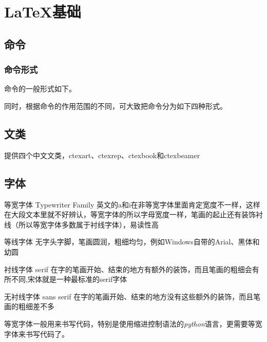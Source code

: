 {\let\clearpage\relax \chapter{\LaTeX 基础}}

\section{命令}

\subsection{命令形式}

命令的一般形式如下。

\begin{latex}
\end{latex}

同时，根据命令的作用范围的不同，可大致把命令分为如下四种形式。

\section{文类}

\CTeX 提供四个中文文类，ctexart、ctexrep、ctexbook和ctexbeamer

\section{字体}

\begin{asparadesc}
    \item[等宽字体] Typewriter Family 英文的a和i在非等宽字体里面肯定宽度不一样，这样在大段文本里就不好辨认，等宽字体的所以字母宽度一样，笔画的起止还有装饰衬线（所以等宽字体多数属于衬线字体），易读性高
    \item[等线字体] 无字头字脚，笔画圆润，粗细均匀，例如Windows自带的Arial、黑体和幼圆
    \item[衬线字体] serif 在字的笔画开始、结束的地方有额外的装饰，而且笔画的粗细会有所不同,宋体就是一种最标准的serif字体
    \item[无衬线字体] sans serif 在字的笔画开始、结束的地方没有这些额外的装饰，而且笔画的粗细差不多
\end{asparadesc}

等宽字体一般用来书写代码，特别是使用缩进控制语法的\emph{python}语言，更需要等宽字体来书写代码了。

